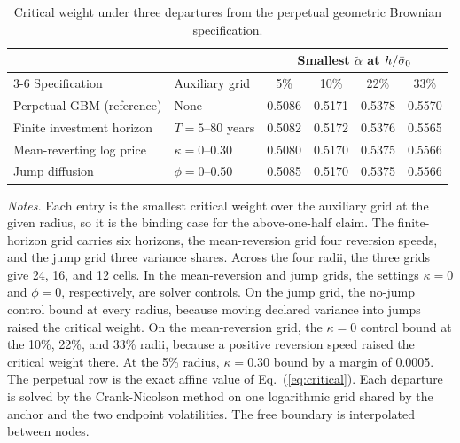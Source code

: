 \begin{table}[!t]
\caption{Critical weight under three departures from the perpetual geometric Brownian specification.}
\label{tab:departures}
\centering
\footnotesize

\begin{tabular}{@{}llcccc@{}}
\toprule
 & & \multicolumn{4}{c}{Smallest $\tilde{\alpha}$ at $h/\bar{\sigma}_0$}\\
\cmidrule(l){3-6}
Specification & Auxiliary grid & 5\% & 10\% & 22\% & 33\%\\
\midrule
Perpetual GBM (reference) & None & 0.5086 & 0.5171 & 0.5378 & 0.5570\\
Finite investment horizon & $T=5$--80 years & 0.5082 & 0.5172 & 0.5376 & 0.5565\\
Mean-reverting log price & $\kappa=0$--0.30 & 0.5080 & 0.5170 & 0.5375 & 0.5566\\
Jump diffusion & $\phi=0$--0.50 & 0.5085 & 0.5170 & 0.5375 & 0.5566\\
\bottomrule
\end{tabular}
\par\smallskip
\parbox{\columnwidth}{\footnotesize\emph{Notes.} Each entry is the smallest critical weight over the auxiliary grid at the given radius, so it is the binding case for the above-one-half claim. The finite-horizon grid carries six horizons, the mean-reversion grid four reversion speeds, and the jump grid three variance shares. Across the four radii, the three grids give 24, 16, and 12 cells. In the mean-reversion and jump grids, the settings $\kappa=0$ and $\phi=0$, respectively, are solver controls. On the jump grid, the no-jump control bound at every radius, because moving declared variance into jumps raised the critical weight. On the mean-reversion grid, the $\kappa=0$ control bound at the 10\%, 22\%, and 33\% radii, because a positive reversion speed raised the critical weight there. At the 5\% radius, $\kappa=0.30$ bound by a margin of 0.0005. The perpetual row is the exact affine value of Eq.~(\ref{eq:critical}). Each departure is solved by the Crank-Nicolson method on one logarithmic grid shared by the anchor and the two endpoint volatilities. The free boundary is interpolated between nodes.}
\end{table}

